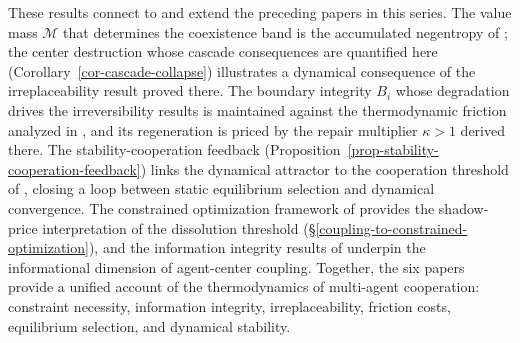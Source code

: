 \documentclass[11pt]{article}
\theoremstyle{plain}
\theoremstyle{definition}
\theoremstyle{remark}
\begin{document}
These results connect to and extend the preceding papers in this series.
The value mass \(\mathcal{M}\) that determines the coexistence band is
the accumulated negentropy of \citep{TC-III}; the center destruction
whose cascade consequences are quantified here
(Corollary~\ref{cor-cascade-collapse}) illustrates a dynamical
consequence of the irreplaceability result proved there. The boundary
integrity \(B_i\) whose degradation drives the irreversibility results
is maintained against the thermodynamic friction analyzed in
\citep{TC-IV}, and its regeneration is priced by the repair multiplier
\(\kappa > 1\) derived there. The stability-cooperation feedback
(Proposition~\ref{prop-stability-cooperation-feedback}) links the
dynamical attractor to the cooperation threshold of \citep{TC-V},
closing a loop between static equilibrium selection and dynamical
convergence. The constrained optimization framework of \citep{TC-I}
provides the shadow-price interpretation of the dissolution threshold
(§\ref{coupling-to-constrained-optimization}), and the information
integrity results of \citep{TC-II} underpin the informational dimension
of agent-center coupling. Together, the six papers provide a unified
account of the thermodynamics of multi-agent cooperation: constraint
necessity, information integrity, irreplaceability, friction costs,
equilibrium selection, and dynamical stability.
\end{document}
